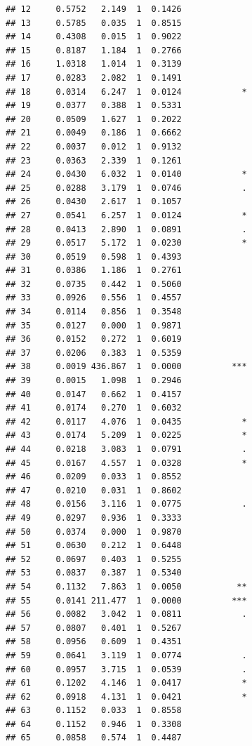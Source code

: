 \documentclass[
]{article}
\begin{document}
\begin{verbatim}
## 12     0.5752   2.149  1  0.1426             
## 13     0.5785   0.035  1  0.8515             
## 14     0.4308   0.015  1  0.9022             
## 15     0.8187   1.184  1  0.2766             
## 16     1.0318   1.014  1  0.3139             
## 17     0.0283   2.082  1  0.1491             
## 18     0.0314   6.247  1  0.0124            *
## 19     0.0377   0.388  1  0.5331             
## 20     0.0509   1.627  1  0.2022             
## 21     0.0049   0.186  1  0.6662             
## 22     0.0037   0.012  1  0.9132             
## 23     0.0363   2.339  1  0.1261             
## 24     0.0430   6.032  1  0.0140            *
## 25     0.0288   3.179  1  0.0746            .
## 26     0.0430   2.617  1  0.1057             
## 27     0.0541   6.257  1  0.0124            *
## 28     0.0413   2.890  1  0.0891            .
## 29     0.0517   5.172  1  0.0230            *
## 30     0.0519   0.598  1  0.4393             
## 31     0.0386   1.186  1  0.2761             
## 32     0.0735   0.442  1  0.5060             
## 33     0.0926   0.556  1  0.4557             
## 34     0.0114   0.856  1  0.3548             
## 35     0.0127   0.000  1  0.9871             
## 36     0.0152   0.272  1  0.6019             
## 37     0.0206   0.383  1  0.5359             
## 38     0.0019 436.867  1  0.0000          ***
## 39     0.0015   1.098  1  0.2946             
## 40     0.0147   0.662  1  0.4157             
## 41     0.0174   0.270  1  0.6032             
## 42     0.0117   4.076  1  0.0435            *
## 43     0.0174   5.209  1  0.0225            *
## 44     0.0218   3.083  1  0.0791            .
## 45     0.0167   4.557  1  0.0328            *
## 46     0.0209   0.033  1  0.8552             
## 47     0.0210   0.031  1  0.8602             
## 48     0.0156   3.116  1  0.0775            .
## 49     0.0297   0.936  1  0.3333             
## 50     0.0374   0.000  1  0.9870             
## 51     0.0630   0.212  1  0.6448             
## 52     0.0697   0.403  1  0.5255             
## 53     0.0837   0.387  1  0.5340             
## 54     0.1132   7.863  1  0.0050           **
## 55     0.0141 211.477  1  0.0000          ***
## 56     0.0082   3.042  1  0.0811            .
## 57     0.0807   0.401  1  0.5267             
## 58     0.0956   0.609  1  0.4351             
## 59     0.0641   3.119  1  0.0774            .
## 60     0.0957   3.715  1  0.0539            .
## 61     0.1202   4.146  1  0.0417            *
## 62     0.0918   4.131  1  0.0421            *
## 63     0.1152   0.033  1  0.8558             
## 64     0.1152   0.946  1  0.3308             
## 65     0.0858   0.574  1  0.4487             

\end{verbatim}
\end{document}
